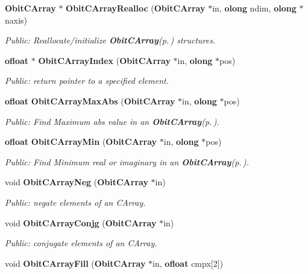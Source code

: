 \begin{CompactItemize}
{\bf Obit\-CArray} $\ast$ {\bf Obit\-CArray\-Realloc} ({\bf Obit\-CArray} $\ast$in, {\bf olong} ndim, {\bf olong} $\ast$naxis)
\begin{CompactList}\small\item\em Public: Reallocate/initialize {\bf Obit\-CArray}{\rm (p.\,\pageref{structObitCArray})} structures. \item\end{CompactList}\item 
{\bf ofloat} $\ast$ {\bf Obit\-CArray\-Index} ({\bf Obit\-CArray} $\ast$in, {\bf olong} $\ast$pos)
\begin{CompactList}\small\item\em Public: return pointer to a specified element. \item\end{CompactList}\item 
{\bf ofloat} {\bf Obit\-CArray\-Max\-Abs} ({\bf Obit\-CArray} $\ast$in, {\bf olong} $\ast$pos)
\begin{CompactList}\small\item\em Public: Find Maximum abs value in an {\bf Obit\-CArray}{\rm (p.\,\pageref{structObitCArray})}. \item\end{CompactList}\item 
{\bf ofloat} {\bf Obit\-CArray\-Min} ({\bf Obit\-CArray} $\ast$in, {\bf olong} $\ast$pos)
\begin{CompactList}\small\item\em Public: Find Minimum real or imaginary in an {\bf Obit\-CArray}{\rm (p.\,\pageref{structObitCArray})}. \item\end{CompactList}\item 
void {\bf Obit\-CArray\-Neg} ({\bf Obit\-CArray} $\ast$in)
\begin{CompactList}\small\item\em Public: negate elements of an CArray. \item\end{CompactList}\item 
void {\bf Obit\-CArray\-Conjg} ({\bf Obit\-CArray} $\ast$in)
\begin{CompactList}\small\item\em Public: conjugate elements of an CArray. \item\end{CompactList}\item 
void {\bf Obit\-CArray\-Fill} ({\bf Obit\-CArray} $\ast$in, {\bf ofloat} cmpx[2])

\end{CompactItemize}
